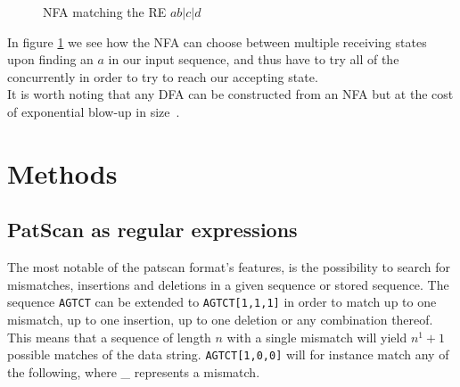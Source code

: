 \documentclass[12pt]{article}
\theoremstyle{definition}
\begin{document}
\begin{figure}[H]
  \begin{center}

	
	\caption{NFA matching the RE \underline{$ab|c|d$}}
	\label{nfa_simple}
  \end{center}
\end{figure}

In figure \ref{nfa_simple} we see how the NFA can choose between multiple receiving states upon finding an $a$ in our input sequence, and thus have to try all of the concurrently in order to try to reach our accepting state. \\
It is worth noting that any DFA can be constructed from an NFA but at the cost of exponential blow-up in size~\cite{nfa-to-dfa}.

\newpage

\section{Methods}
\subsection{PatScan as regular expressions}

The most notable of the patscan format's features, is the possibility to search for mismatches, insertions and deletions in a given sequence or stored sequence. The sequence \texttt{AGTCT} can be extended to \texttt{AGTCT[1,1,1]} in order to match up to one mismatch, up to one insertion, up to one deletion or any combination thereof. This means that a sequence of length $n$ with a single mismatch will yield $n^1+1$ possible matches of the data string. \texttt{AGTCT[1,0,0]} will for instance match any of the following, where \_ represents a mismatch.
\end{document}
